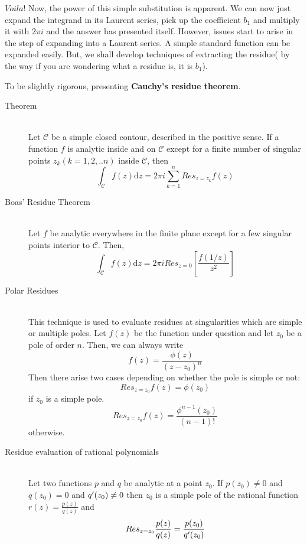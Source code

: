 \documentclass[11pt]{article}
\begin{document}
\begin{sloppypar}
$Voila!$ Now, the power of this simple substitution is apparent. We can now just expand the integrand in its Laurent series, pick up the coefficient $b_{1}$ and multiply it with $2\pi i$ and the answer has presented itself. However, issues start to arise in the step of expanding into a Laurent series. A simple standard function can be expanded easily. But, we shall develop techniques of extracting the residue( by the way if you are wondering what a residue is, it is $b_{1}$).

To be slightly rigorous, presenting \textbf{Cauchy\rq{}s residue theorem}.
\begin{description}
\item[Theorem] \hfill \\
	Let $\mathcal{C}$ be a simple closed contour, described in the positive sense. If a function $f$ is analytic inside and on $\mathcal{C}$ except for a finite number of singular points $z_{k}(k=1,2,..n)$ inside $\mathcal{C}$, then
$$\int_{\mathcal{C}}f(z)\mathrm{d}z = 2\pi i\sum_{k=1}^{n}Res_{z=z_{k}}f(z)$$

\item[Boas\rq{} Residue Theorem] \hfill \\
	Let $f$ be analytic everywhere in the finite plane except for a few singular points interior to $\mathcal{C}$. Then,
$$\int_{\mathcal{C}}f(z)\mathrm{d}z = 2\pi i Res_{z=0}[\frac{f(1/z)}{z^2}]$$

\item[Polar Residues] \hfill \\
	This technique is used to evaluate residues at singularities which are simple or multiple poles. Let $f(z)$ be the function under question and let $z_{0}$ be a pole of order $n$. Then, we can always write $$f(z) = \frac{\phi(z)}{(z-z_{0})^n}$$ Then there arise two cases depending on whether the pole is simple or not:
	$$Res_{z=z_{0}}f(z) = \phi(z_{0})$$ if $z_{0}$ is a simple pole.
	$$Res_{z=z_{0}}f(z) = \frac{\phi^{n-1}(z_{0})}{(n-1)!}$$ otherwise.

\item[Residue evaluation of rational polynomials] \hfill \\
	Let two functions $p$ and $q$ be analytic at a point $z_{0}$. If $p(z_{0}) \neq 0$ and $q(z_{0}) = 0$ and $q\rq{}(z_{0}) \neq 0$ then $z_{0}$ is a simple pole of the rational function $r(z) = \frac{p(z)}{q(z)}$ and 
$$Res_{z=z_{0}}\frac{p(z)}{q(z)} = \frac{p(z_{0})}{q\rq{}(z_{0})}$$

\end{description}


\end{sloppypar}
\end{document}
